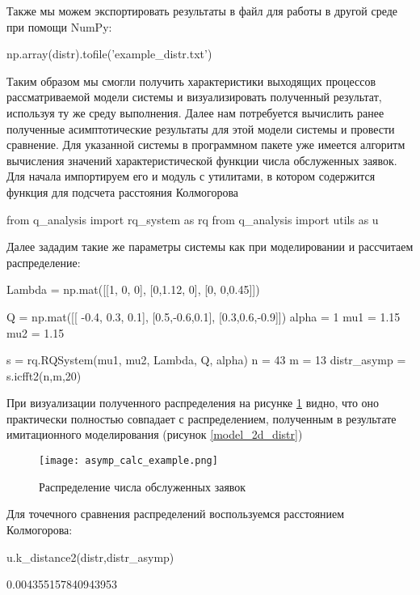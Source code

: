 Также мы можем экспортировать результаты в файл для работы в другой среде при помощи NumPy:
\begin{pyin} [rqtestchar]
np.array(distr).tofile('example_distr.txt')
\end{pyin}
Таким образом мы смогли получить характеристики выходящих процессов рассматриваемой модели системы и визуализировать полученный результат, используя ту же среду выполнения. Далее нам потребуется вычислить ранее полученные асимптотические результаты для этой модели системы и провести сравнение. Для указанной системы в программном пакете уже имеется алгоритм вычисления значений характеристической функции числа обслуженных заявок. Для начала импортируем его и модуль с утилитами, в котором содержится функция для подсчета расстояния Колмогорова

\begin{pyin} 
from q_analysis import rq_system as rq
from q_analysis import utils as u
\end{pyin}

Далее зададим такие же параметры системы как при моделировании и рассчитаем распределение:

\begin{pyin} 
Lambda = np.mat([[1, 0,   0],
[0,1.12, 0],
[0, 0,0.45]])

Q = np.mat([[ -0.4, 0.3, 0.1],
[0.5,-0.6,0.1],
[0.3,0.6,-0.9]])
alpha = 1
mu1 = 1.15
mu2 = 1.15

s = rq.RQSystem(mu1, mu2, Lambda, Q, alpha)
n = 43
m = 13
distr_asymp =    s.icfft2(n,m,20)
\end{pyin}

При визуализации полученного распределения на рисунке \ref{asymp_calc_example} видно, что оно практически полностью совпадает с распределением, полученным в результате имитационного моделирования (рисунок \ref{model_2d_distr})

\begin{figure}[H]
	\centering
	\texttt{[image: asymp\_calc\_example.png]}
	\caption{Распределение числа обслуженных заявок} 
	\label{asymp_calc_example}
\end{figure}

Для точечного сравнения распределений воспользуемся расстоянием Колмогорова:

\begin{pyin} 
u.k_distance2(distr,distr_asymp)
\end{pyin}

\begin{pyout} 
0.004355157840943953
\end{pyout}

